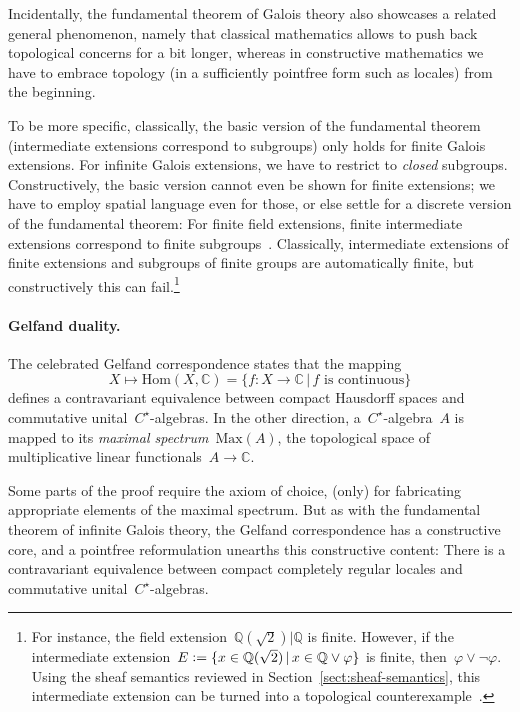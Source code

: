\documentclass{ws-rv9x6}
\newcommand{\QQ}{\mathbb{Q}}
\newcommand{\CC}{\mathbb{C}}
\newcommand{\defeq}{\vcentcolon=}
\newcommand{\Hom}{\mathrm{Hom}}
\newcommand{\Max}{\mathrm{Max}}
\renewcommand{\_}{\mathpunct{.}}
\newcommand{\?}{\,{:}\,}
\begin{document}
\begin{remark}Incidentally, the fundamental theorem of Galois theory also
showcases a related general phenomenon, namely that classical mathematics
allows to push back topological concerns for a bit longer,
whereas in constructive mathematics we have to embrace topology
(in a sufficiently pointfree form such as locales) from the beginning.

To be more specific, classically, the basic version of the fundamental theorem
(intermediate extensions correspond to subgroups) only holds for finite Galois
extensions. For infinite Galois extensions, we have to restrict to
\emph{closed} subgroups. Constructively, the basic version cannot even be shown
for finite extensions; we have to employ spatial language even for those, or
else settle for a discrete version of the fundamental theorem: For finite field
extensions, finite intermediate extensions correspond to finite
subgroups~\cite[Theorem~8.8]{mines-richman-ruitenburg:constructive-algebra}.
Classically, intermediate extensions of finite extensions and subgroups of
finite groups are automatically finite, but constructively this can
fail.\footnote{For instance, the field extension~$\QQ(\sqrt{2})|\QQ$ is finite.
However, if the intermediate extension~$E \defeq \{ x \in \QQ(\sqrt{2}) \,|\, x
\in \QQ \vee \varphi \}$ is finite, then~$\varphi \vee \neg\varphi$. Using the
sheaf semantics reviewed in Section~\ref{sect:sheaf-semantics}, this
intermediate extension can be turned into a topological
counterexample~\cite[page~65]{wraith:localic-groups}.}
\end{remark}

\paragraph{Gelfand duality.} The celebrated Gelfand correspondence states that
the mapping
\[ X \longmapsto \Hom(X, \CC) = \{ f : X \to \CC \,|\, \text{$f$ is continuous} \} \]
defines a contravariant equivalence between compact Hausdorff spaces and
commutative unital~$C^\star$-algebras. In the other direction,
a~$C^\star$-algebra~$A$ is mapped to its \emph{maximal spectrum}~$\Max(A)$, the
topological space of multiplicative linear functionals~$A \to \CC$.

Some parts of the proof require the axiom of choice, (only) for fabricating
appropriate elements of the maximal spectrum. But as with the fundamental
theorem of infinite Galois theory, the Gelfand correspondence has a
constructive core, and a pointfree reformulation unearths this constructive
content: There is a contravariant equivalence between compact completely
regular locales and commutative unital~$C^\star$-algebras.
\end{document}
